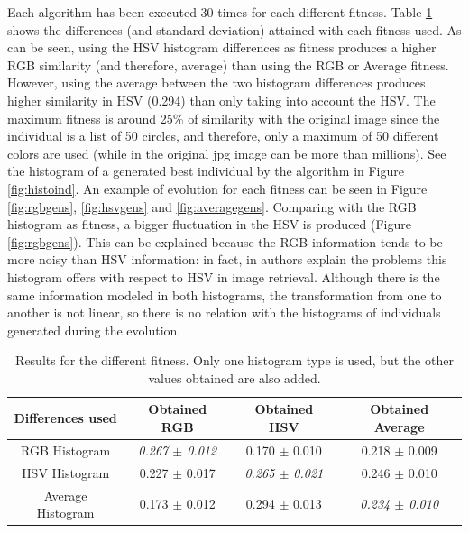 \documentclass[conference]{IEEEtran}
\begin{document}
Each algorithm has been executed 30 times for each different fitness. Table \ref{tab:results} shows the differences (and standard deviation) attained with each fitness used. As can be seen, using the HSV histogram differences as fitness produces a higher RGB similarity (and therefore, average) than using the RGB or Average fitness. However, using the average between the two histogram differences produces higher similarity in HSV (0.294) than only taking into account the HSV. The maximum fitness is around 25\% of similarity with the original image since the individual is a list of 50 circles, and therefore, only a maximum of 50 different colors are used (while in the original jpg image can be more than millions). See the histogram of a generated best individual by the algorithm in Figure \ref{fig:histoind}. An example of evolution for each fitness can be seen in Figure \ref{fig:rgbgens}, \ref{fig:hsvgens} and \ref{fig:averagegens}. Comparing with the RGB histogram as fitness, a bigger fluctuation in the HSV is produced (Figure \ref{fig:rgbgens}). This can be explained because the RGB information tends to be more noisy than HSV information: in fact, in \cite{COLORDIFFERENCES} authors explain the problems this histogram offers with respect to HSV in image retrieval. Although there is the same information modeled in both histograms, the transformation from one to another is not linear, so there is no relation with the histograms of individuals generated during the evolution.

\begin{table}
\centering
\caption{Results for the different fitness. Only one histogram type is used, but the other values obtained are also added.}
\begin{tabular}{|c|c|c|c|} \hline
Differences used & Obtained RGB      		& Obtained HSV  & Obtained Average \\ \hline
RGB Histogram    & {\em 0.267 $\pm$ 0.012}	& 0.170 $\pm$ 0.010 	& 0.218 $\pm$ 0.009	\\ \hline
HSV Histogram    & 0.227 $\pm$ 0.017	& {\em 0.265 $\pm$ 0.021}	& 0.246 $\pm$ 0.010 \\ \hline
Average Histogram& 0.173 $\pm$ 0.012	& 0.294 $\pm$ 0.013	& {\em 0.234 $\pm$ 0.010} \\ \hline
\end{tabular}
\label{tab:results}
\end{table}
\end{document}
